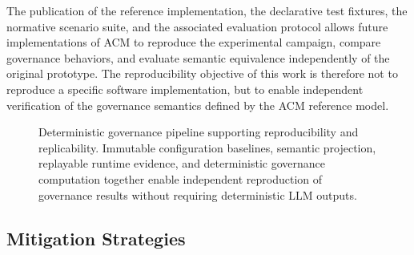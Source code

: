 \documentclass[10pt]{article}
\begin{document}
The publication of the reference implementation, the declarative test
fixtures, the normative scenario suite, and the associated evaluation protocol
allows future implementations of ACM to reproduce the experimental campaign,
compare governance behaviors, and evaluate semantic equivalence independently
of the original prototype. The reproducibility objective of this work is
therefore not to reproduce a specific software implementation, but to enable
independent verification of the governance semantics defined by the ACM
reference model.

\begin{figure}[t]
    \centering
    \caption{Deterministic governance pipeline supporting reproducibility and replicability. Immutable configuration baselines, semantic projection, replayable runtime evidence, and deterministic governance computation together enable independent reproduction of governance results without requiring deterministic LLM outputs.}
    \label{fig:reproducibility_pipeline}
\end{figure}

\subsection{Mitigation Strategies}
\label{sec:mitigation_strategies}
\end{document}
